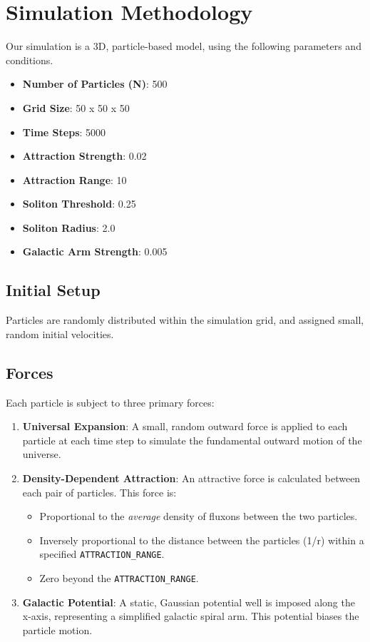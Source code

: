 \documentclass[11pt]{article}
\begin{document}
\section{Simulation Methodology}
Our simulation is a 3D, particle-based model, using the following parameters and conditions.

\begin{itemize}
    \item \textbf{Number of Particles (N)}: 500
    \item \textbf{Grid Size}: 50 x 50 x 50
    \item \textbf{Time Steps}: 5000
    \item \textbf{Attraction Strength}: 0.02
    \item \textbf{Attraction Range}: 10
    \item \textbf{Soliton Threshold}: 0.25
    \item \textbf{Soliton Radius}: 2.0
\item \textbf{Galactic Arm Strength}: 0.005
\end{itemize}

\subsection{Initial Setup}
Particles are randomly distributed within the simulation grid, and assigned small, random initial velocities.

\subsection{Forces}
Each particle is subject to three primary forces:

\begin{enumerate}
  \item \textbf{Universal Expansion}: A small, random outward force is applied to each particle at each time step to simulate the fundamental outward motion of the universe.
  \item \textbf{Density-Dependent Attraction}: An attractive force is calculated between each pair of particles. This force is:
    \begin{itemize}
        \item Proportional to the \textit{average} density of fluxons between the two particles.
        \item Inversely proportional to the distance between the particles (1/r) within a specified \texttt{ATTRACTION\_RANGE}.
        \item Zero beyond the \texttt{ATTRACTION\_RANGE}.
    \end{itemize}
  \item \textbf{Galactic Potential}: A static, Gaussian potential well is imposed along the x-axis, representing a simplified galactic spiral arm. This potential biases the particle motion.
\end{enumerate}
\end{document}
